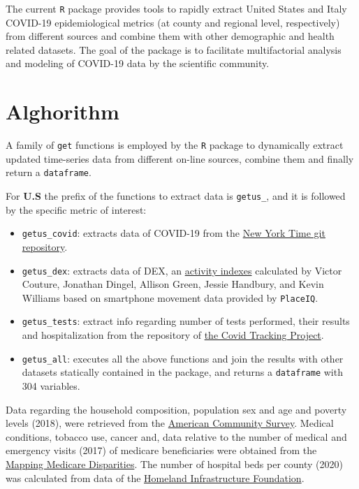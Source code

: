 \documentclass[12pt,halfline,a4paper,]{ouparticle}
\providecommand{\tightlist}{%
  \setlength{\itemsep}{0pt}\setlength{\parskip}{0pt}}
\begin{document}
The current \texttt{R} package provides tools to rapidly extract United
States and Italy COVID-19 epidemiological metrics (at county and
regional level, respectively) from different sources and combine them
with other demographic and health related datasets. The goal of the
package is to facilitate multifactorial analysis and modeling of
COVID-19 data by the scientific community.

\hypertarget{alghorithm}{%
\section{Alghorithm}\label{alghorithm}}

A family of \texttt{get} functions is employed by the \texttt{R} package
to dynamically extract updated time-series data from different on-line
sources, combine them and finally return a \texttt{dataframe}.

For \textbf{U.S} the prefix of the functions to extract data is
\texttt{getus\_}, and it is followed by the specific metric of interest:

\begin{itemize}
\tightlist
\item
  \texttt{getus\_covid}: extracts data of COVID-19 from the
  \href{https://github.com/nytimes/covid-19-data}{New York Time git
  repository}.
\item
  \texttt{getus\_dex}: extracts data of DEX, an
  \href{https://github.com/COVIDExposureIndices/COVIDExposureIndices}{activity
  indexes} calculated by Victor Couture, Jonathan Dingel, Allison Green,
  Jessie Handbury, and Kevin Williams based on smartphone movement data
  provided by \texttt{PlaceIQ}.
\item
  \texttt{getus\_tests}: extract info regarding number of tests
  performed, their results and hospitalization from the repository of
  \href{https://covidtracking.com/api\%7D}{the Covid Tracking Project}.
\item
  \texttt{getus\_all}: executes all the above functions and join the
  results with other datasets statically contained in the package, and
  returns a \texttt{dataframe} with 304 variables.
\end{itemize}

Data regarding the household composition, population sex and age and
poverty levels (2018), were retrieved from the
\href{https://data.census.gov/cedsci/table?q=United\%20States}{American
Community Survey}. Medical conditions, tobacco use, cancer and, data
relative to the number of medical and emergency visits (2017) of
medicare beneficiaries were obtained from the
\href{https://data.cms.gov/mapping-medicare-disparities}{Mapping
Medicare Disparities}. The number of hospital beds per county (2020) was
calculated from data of the
\href{https://hifld-geoplatform.opendata.arcgis.com/datasets/hospitals/data?page=18}{Homeland
Infrastructure Foundation}.
\end{document}
